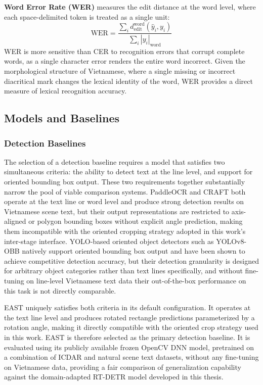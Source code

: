 \textbf{Word Error Rate (WER)} measures the edit distance at the word level, where each space-delimited token is treated as a single unit:
\begin{equation}
\text{WER} = \frac{\sum_i d_{\text{edit}}^{\text{word}}(\hat{y}_i, y_i)}{\sum_i |y_i|_{\text{word}}}
\end{equation}
WER is more sensitive than CER to recognition errors that corrupt complete words, as a single character error renders the entire word incorrect. Given the morphological structure of Vietnamese, where a single missing or incorrect diacritical mark changes the lexical identity of the word, WER provides a direct measure of lexical recognition accuracy.

\subsection{Models and Baselines}

\subsubsection{Detection Baselines}

The selection of a detection baseline requires a model that satisfies two simultaneous criteria: the ability to detect text at the line level, and support for oriented bounding box output. These two requirements together substantially narrow the pool of viable comparison systems. PaddleOCR \cite{Li2022PaddleOCR} and CRAFT \cite{Baek2019} both operate at the text line or word level and produce strong detection results on Vietnamese scene text, but their output representations are restricted to axis-aligned or polygon bounding boxes without explicit angle prediction, making them incompatible with the oriented cropping strategy adopted in this work's inter-stage interface. YOLO-based oriented object detectors such as YOLOv8-OBB natively support oriented bounding box output and have been shown to achieve competitive detection accuracy, but their detection granularity is designed for arbitrary object categories rather than text lines specifically, and without fine-tuning on line-level Vietnamese text data their out-of-the-box performance on this task is not directly comparable.

EAST \cite{Zhou2017} uniquely satisfies both criteria in its default configuration. It operates at the text line level and produces rotated rectangle predictions parameterized by a rotation angle, making it directly compatible with the oriented crop strategy used in this work. EAST is therefore selected as the primary detection baseline. It is evaluated using its publicly available frozen OpenCV DNN model, pretrained on a combination of ICDAR and natural scene text datasets, without any fine-tuning on Vietnamese data, providing a fair comparison of generalization capability against the domain-adapted RT-DETR model developed in this thesis.

